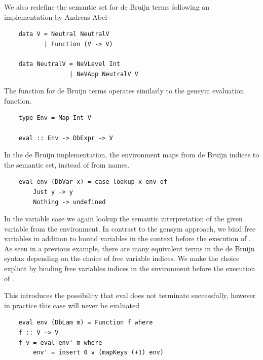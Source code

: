 We also redefine the semantic set for de Bruijn terms following an implementation by Andreas Abel \cite{deBruijn}

\begin{lstlisting}
    data V = Neutral NeutralV
           | Function (V -> V)

    data NeutralV = NeVLevel Int
                  | NeVApp NeutralV V
\end{lstlisting}


The  function for de Bruijn terms operates similarly to the gensym evaluation function. 

\begin{lstlisting}
    type Env = Map Int V

    eval :: Env -> DbExpr -> V
\end{lstlisting}

In the de Bruijn implementation, the environment maps from de Bruijn indices to the semantic set, instead of from names.

\begin{lstlisting}
    eval env (DbVar x) = case lookup x env of
        Just y -> y
        Nothing -> undefined
\end{lstlisting}

In the variable case we again lookup the semantic interpretation of the given variable from the environment. In contrast to the gensym approach, we bind free variables in addition to bound variables in the context before the execution of . As seen in a previous example, there are many equivalent terms in the de Bruijn syntax depending on the choice of free variable indices. We make the choice explicit by binding free variables indices in the environment before the execution of . 


This introduces the possibility that eval does not terminate successfully, however in practice this case will never be evaluated 


\begin{lstlisting}
    eval env (DbLam m) = Function f where
    f :: V -> V
    f v = eval env' m where
        env' = insert 0 v (mapKeys (+1) env)
\end{lstlisting}

